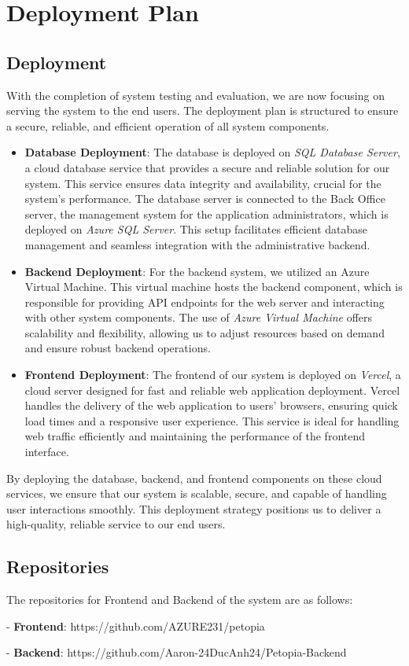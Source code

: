 \chapter{Deployment Plan}

\section{Deployment}

With the completion of system testing and evaluation, we are now focusing on serving the system to the end users. The deployment plan is structured to ensure a secure, reliable, and efficient operation of all system components.

\begin{itemize}
    \item \textbf{Database Deployment}: The database is deployed on \textit{SQL Database Server}, a cloud database service that provides a secure and reliable solution for our system. This service ensures data integrity and availability, crucial for the system's performance. The database server is connected to the Back Office server, the management system for the application administrators, which is deployed on \textit{Azure SQL Server}. This setup facilitates efficient database management and seamless integration with the administrative backend.
    \item \textbf{Backend Deployment}: For the backend system, we utilized an Azure Virtual Machine. This virtual machine hosts the backend component, which is responsible for providing API endpoints for the web server and interacting with other system components. The use of \textit{Azure Virtual Machine} offers scalability and flexibility, allowing us to adjust resources based on demand and ensure robust backend operations.
    \item \textbf{Frontend Deployment}: The frontend of our system is deployed on \textit{Vercel}, a cloud server designed for fast and reliable web application deployment. Vercel handles the delivery of the web application to users' browsers, ensuring quick load times and a responsive user experience. This service is ideal for handling web traffic efficiently and maintaining the performance of the frontend interface.
\end{itemize}

By deploying the database, backend, and frontend components on these cloud services, we ensure that our system is scalable, secure, and capable of handling user interactions smoothly. This deployment strategy positions us to deliver a high-quality, reliable service to our end users.

\section{Repositories}

The repositories for Frontend and Backend of the system are as follows:

- \textbf{Frontend}: https://github.com/AZURE231/petopia

- \textbf{Backend}: https://github.com/Aaron-24DucAnh24/Petopia-Backend
